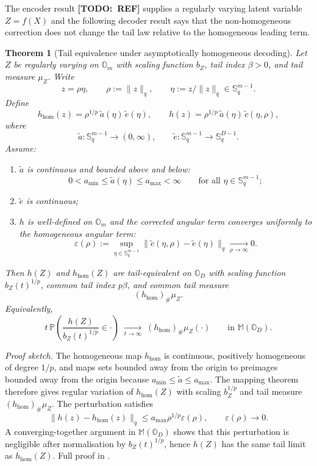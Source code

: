 \documentclass{article}
\newtheorem{theorem}{Theorem}
\theoremstyle{definition}
\newcommand{\todo}[1]{{\color{red}\textbf{[TODO:~#1]}}}
\begin{document}
The encoder result \todo{REF} supplies a regularly varying latent variable \(Z=f(X)\) and the following decoder result says that the non-homogeneous correction does not change the tail law relative to the homogeneous leading term.

\begin{theorem}[Tail equivalence under asymptotically homogeneous decoding]
\label{thm:decoder-tail-equivalence}
Let \(Z\) be regularly varying on \(\mathbb{O}_m\) with scaling function
\(b_Z\), tail index \(\beta>0\), and tail measure \(\mu_Z\). Write
\[
z=\rho\eta,
\qquad
\rho:=\|z\|_q,
\qquad
\eta:=z/\|z\|_q\in\mathbb{S}^{m-1}_q.
\]
Define
\[
h_{\mathrm{hom}}(z)
=
\rho^{1/p}\,\tilde a(\eta)\,\tilde e(\eta),
\qquad
h(z)
=
\rho^{1/p}\,\tilde a(\eta)\,\tilde c(\eta,\rho),
\]
where
\[
\tilde a:\mathbb{S}^{m-1}_q\to(0,\infty),
\qquad
\tilde e:\mathbb{S}^{m-1}_q\to\mathbb{S}^{D-1}_q.
\]
Assume:
\begin{enumerate}
  \item[(A1)] \(\tilde a\) is continuous and bounded above and below:
  \[
  0<a_{\min}\le \tilde a(\eta)\le a_{\max}<\infty
  \qquad
  \text{for all }\eta\in\mathbb{S}^{m-1}_q;
  \]
  \item[(A2)] \(\tilde e\) is continuous;
  \item[(A3)] \(h\) is well-defined on \(\mathbb{O}_m\) and the corrected
  angular term converges uniformly to the homogeneous angular term:
  \[
  \varepsilon(\rho)
  :=
  \sup_{\eta\in\mathbb{S}^{m-1}_q}
  \|\tilde c(\eta,\rho)-\tilde e(\eta)\|_q
  \xrightarrow[\rho\to\infty]{}0.
  \]
\end{enumerate}
Then \(h(Z)\) and \(h_{\mathrm{hom}}(Z)\) are tail-equivalent on
\(\mathbb{O}_D\) with scaling function \(b_Z(t)^{1/p}\), common tail index
\(p\beta\), and common tail measure
\[
(h_{\mathrm{hom}})_{\#}\mu_Z.
\]
Equivalently,
\[
t\,\mathbb{P}\!\left(
\frac{h(Z)}{b_Z(t)^{1/p}}\in\cdot
\right)
\;\xrightarrow[t\to\infty]{}\;
(h_{\mathrm{hom}})_{\#}\mu_Z(\cdot)
\qquad
\text{in }\mathbb{M}(\mathbb{O}_D).
\]
\end{theorem}

\noindent\emph{Proof sketch.}
The homogeneous map \(h_{\mathrm{hom}}\) is continuous, positively homogeneous
of degree \(1/p\), and maps sets bounded away from the origin to preimages
bounded away from the origin because \(a_{\min}\le\tilde a\le a_{\max}\).
The mapping theorem therefore gives regular variation of \(h_{\mathrm{hom}}(Z)\)
with scaling \(b_Z^{1/p}\) and tail measure \((h_{\mathrm{hom}})_{\#}\mu_Z\).
The perturbation satisfies
\[
\|h(z)-h_{\mathrm{hom}}(z)\|_q
\le
a_{\max}\rho^{1/p}\varepsilon(\rho),
\qquad
\varepsilon(\rho)\to0.
\]
A converging-together argument in \(\mathbb{M}(\mathbb{O}_D)\) shows that this
perturbation is negligible after normalisation by \(b_Z(t)^{1/p}\), hence \(h(Z)\)
has the same tail limit as \(h_{\mathrm{hom}}(Z)\). Full proof in
.
\end{document}
